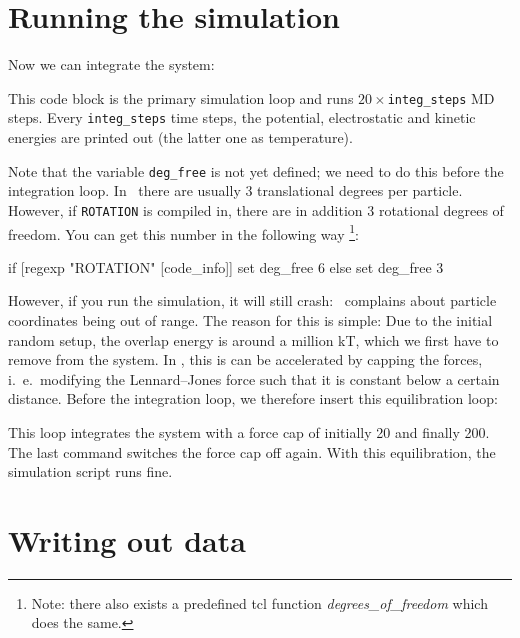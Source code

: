 \documentclass[
a4paper,                        %
11pt,                           %
twoside,                        %
footsepline,                    %
headsepline,                    %
headexclude,                    %
footexclude,                    %
pagesize,                       %
]{scrartcl}
\begin{document}
\section{Running the simulation}

Now we can integrate the system:
This code block is the primary simulation loop and runs
$20\times$\verb|integ_steps| MD steps. Every \verb|integ_steps| time
steps, the potential, electrostatic and kinetic energies are printed
out (the latter one as temperature).

Note that the variable \verb|deg_free| is not yet defined; we need to
do this before the integration loop. In \es\ there are usually 3
translational  degrees per particle. However, if \verb|ROTATION| is
compiled in, there are in addition 3 rotational degrees of freedom.
You can get this number in the following way \footnote{Note: there
  also exists a predefined tcl function {\it degrees\_of\_freedom} which
  does the same.}:

\begin{tclcode}
  if { [regexp "ROTATION" [code_info]] } { set deg_free 6 } else { set
    deg_free 3 }
\end{tclcode}

However, if you run the simulation, it will still
crash: \es\ complains about particle coordinates being out of range.
The reason for this is simple: Due to the initial random setup, the
overlap energy is around a million kT, which we first have to remove
from the system. In \es, this is can be accelerated by capping the
forces, i.~e.\ modifying the Lennard--Jones force such that it is
constant below a certain distance. Before the integration loop, we
therefore insert this equilibration loop:
This loop integrates the system with a force cap of initially 20 and
finally 200.  The last command switches the force cap off again. With
this equilibration, the simulation script runs fine.

\section{Writing out data}
\end{document}
